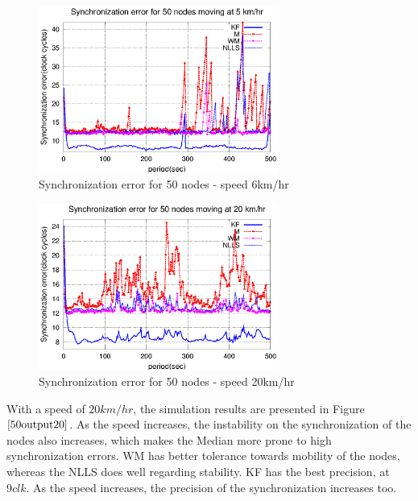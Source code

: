 \documentclass[a4paper,10pt]{report}
\begin{document}
\paragraph*{}
\begin{figure}
\centering
\includegraphics[width=0.7\textwidth]{50output-s6}
\caption{Synchronization error for 50 nodes - speed 6km/hr}
\label{50output6}
\end{figure}
\begin{figure}
\centering
\includegraphics[width=0.7\textwidth]{50output-s20}
\caption{Synchronization error for 50 nodes - speed 20km/hr} \label{50output20}
\end{figure}
With a speed of $20km/hr$, the simulation results are presented in Figure $\ref{50output20}$. As the speed increases, the instability
on the synchronization of the nodes also increases, which makes the Median more prone to high synchronization errors. WM has better
tolerance towards mobility of the nodes, whereas the NLLS does well regarding stability. KF has the best precision, at $9clk$. As the
speed increases, the precision of the synchronization increases too.
\end{document}
